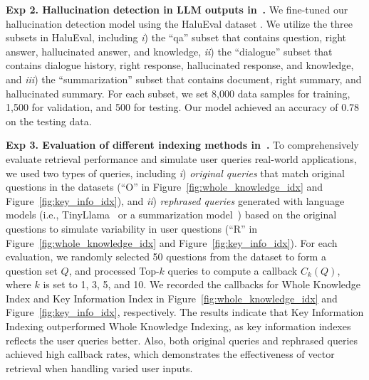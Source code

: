 \noindent\textbf{Exp 2. Hallucination detection in LLM outputs in~\detection. } 
We fine-tuned our hallucination detection model using the HaluEval dataset \cite{li2023halueval}. We utilize the three subsets in HaluEval, including \textit{i}) the ``qa'' subset that 
contains question, right answer, hallucinated answer, and knowledge,  \textit{ii}) the ``dialogue'' subset that contains dialogue history, right response, hallucinated response, and knowledge, and  \textit{iii})
the ``summarization'' subset that contains document, right summary, and hallucinated summary.
For each subset, we set 8,000 data samples for training, 1,500 for validation, and 500 for testing.  
Our model achieved an accuracy of 0.78 on the testing data. 



\noindent\textbf{Exp 3. Evaluation of different indexing methods in~\grounding. }
To comprehensively evaluate retrieval performance and simulate user queries real-world applications, we used two types of queries, including \textit{i}) \textit{original queries} that match original questions in the datasets (``O'' in Figure~\ref{fig:whole_knowledge_idx} and Figure~\ref{fig:key_info_idx}), and \textit{ii}) \textit{rephrased queries} generated with language models (i.e., TinyLlama~\citep{zhang2024tinyllama} or a summarization  model~\citep{summarization-model}) based on the original questions to simulate variability in user questions (``R'' in Figure~\ref{fig:whole_knowledge_idx} and Figure~\ref{fig:key_info_idx}). 
For each evaluation, we randomly selected 50 questions from the dataset to form a question set $Q$, and processed Top-$k$ queries to compute a callback $C_k(Q)$, where $k$ is set to 1, 3, 5, and 10.
We recorded the callbacks for Whole Knowledge Index and Key Information Index in Figure~\ref{fig:whole_knowledge_idx} and Figure~\ref{fig:key_info_idx}, respectively.
The results indicate that Key Information Indexing outperformed Whole Knowledge Indexing, as key information indexes reflects the user queries better. Also, both original queries and rephrased queries achieved high callback rates, which demonstrates the effectiveness of vector retrieval when handling varied user inputs.





